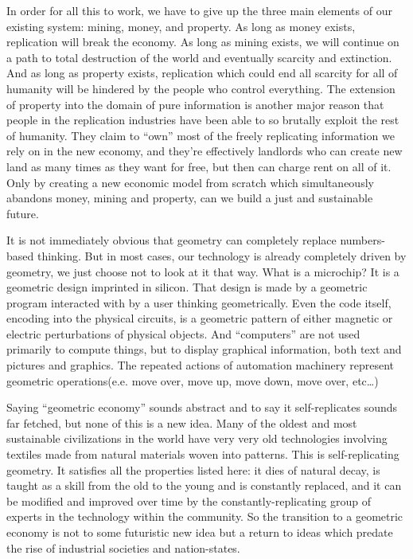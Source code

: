 \documentclass[12pt,a4paper]{amsart}
\numberwithin{equation}{section}
\begin{document}
In order for all this to work, we have to give up the three main
elements of our existing system: mining, money, and property. As long as
money exists, replication will break the economy. As long as mining
exists, we will continue on a path to total destruction of the world and
eventually scarcity and extinction. And as long as property exists,
replication which could end all scarcity for all of humanity will be
hindered by the people who control everything. The extension of property
into the domain of pure information is another major reason that people
in the replication industries have been able to so brutally exploit the
rest of humanity. They claim to ``own'' most of the freely replicating
information we rely on in the new economy, and they're effectively
landlords who can create new land as many times as they want for free,
but then can charge rent on all of it. Only by creating a new economic
model from scratch which simultaneously abandons money, mining and
property, can we build a just and sustainable future.

It is not immediately obvious that geometry can completely replace
numbers-based thinking. But in most cases, our technology is already
completely driven by geometry, we just choose not to look at it that
way. What is a microchip? It is a geometric design imprinted in silicon.
That design is made by a geometric program interacted with by a user
thinking geometrically. Even the code itself, encoding into the physical
circuits, is a geometric pattern of either magnetic or electric
perturbations of physical objects. And ``computers'' are not used
primarily to compute things, but to display graphical information, both
text and pictures and graphics. The repeated actions of automation
machinery represent geometric operations(e.e. move over, move up, move
down, move over, etc\ldots{})

Saying ``geometric economy'' sounds abstract and to say it
self-replicates sounds far fetched, but none of this is a new idea. Many
of the oldest and most sustainable civilizations in the world have very
very old technologies involving textiles made from natural materials
woven into patterns. This is self-replicating geometry. It satisfies all
the properties listed here: it dies of natural decay, is taught as a
skill from the old to the young and is constantly replaced, and it can
be modified and improved over time by the constantly-replicating group
of experts in the technology within the community. So the transition to
a geometric economy is not to some futuristic new idea but a return to
ideas which predate the rise of industrial societies and nation-states.
\end{document}
